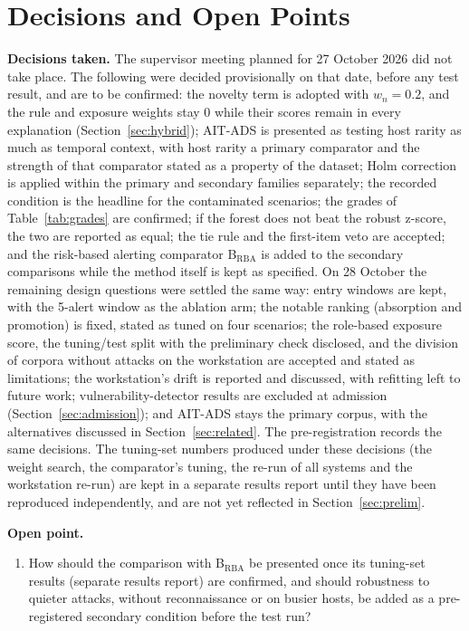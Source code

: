 \documentclass[conference]{IEEEtran}
\begin{document}
\section{Decisions and Open Points}
\label{sec:open}

\textbf{Decisions taken.} The supervisor meeting planned for 27 October 2026 did not take place. The following were decided provisionally on that date, before any test result, and are to be confirmed: the novelty term is adopted with $w_n = 0.2$, and the rule and exposure weights stay 0 while their scores remain in every explanation (Section~\ref{sec:hybrid}); AIT-ADS is presented as testing host rarity as much as temporal context, with host rarity a primary comparator and the strength of that comparator stated as a property of the dataset; Holm correction is applied within the primary and secondary families separately; the recorded condition is the headline for the contaminated scenarios; the grades of Table~\ref{tab:grades} are confirmed; if the forest does not beat the robust z-score, the two are reported as equal; the tie rule and the first-item veto are accepted; and the risk-based alerting comparator B$_\mathrm{RBA}$ is added to the secondary comparisons while the method itself is kept as specified. On 28 October the remaining design questions were settled the same way: entry windows are kept, with the 5-alert window as the ablation arm; the notable ranking (absorption and promotion) is fixed, stated as tuned on four scenarios; the role-based exposure score, the tuning/test split with the preliminary check disclosed, and the division of corpora without attacks on the workstation are accepted and stated as limitations; the workstation's drift is reported and discussed, with refitting left to future work; vulnerability-detector results are excluded at admission (Section~\ref{sec:admission}); and AIT-ADS stays the primary corpus, with the alternatives discussed in Section~\ref{sec:related}. The pre-registration records the same decisions. The tuning-set numbers produced under these decisions (the weight search, the comparator's tuning, the re-run of all systems and the workstation re-run) are kept in a separate results report until they have been reproduced independently, and are not yet reflected in Section~\ref{sec:prelim}.

\textbf{Open point.}
\begin{enumerate}
\item How should the comparison with B$_\mathrm{RBA}$ be presented once its tuning-set results (separate results report) are confirmed, and should robustness to quieter attacks, without reconnaissance or on busier hosts, be added as a pre-registered secondary condition before the test run?
\end{enumerate}
\end{document}
